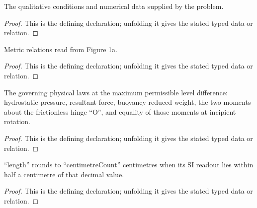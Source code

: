 \begin{definition}[MatchesProblemSetup]
  \label{decl:physics:IPhO_2026_1_A_1:MatchesProblemSetup}
  The qualitative conditions and numerical data supplied by the problem.
\end{definition}
\begin{proof}
  This is the defining declaration; unfolding it gives the stated typed data or relation.
\end{proof}

\begin{definition}[MatchesFigure1a]
  \label{decl:physics:IPhO_2026_1_A_1:MatchesFigure1a}
  Metric relations read from Figure 1a.
\end{definition}
\begin{proof}
  This is the defining declaration; unfolding it gives the stated typed data or relation.
\end{proof}

\begin{definition}[HydrostaticGateLaws]
  \label{decl:physics:IPhO_2026_1_A_1:HydrostaticGateLaws}
  The governing physical laws at the maximum permissible level difference: hydrostatic pressure, resultant force, buoyancy-reduced weight, the two moments about the frictionless hinge “O”, and equality of those moments at incipient rotation.
\end{definition}
\begin{proof}
  This is the defining declaration; unfolding it gives the stated typed data or relation.
\end{proof}

\begin{definition}[RoundsToNearestCentimeterSI]
  \label{decl:physics:IPhO_2026_1_A_1:RoundsToNearestCentimeterSI}
  “length” rounds to “centimetreCount” centimetres when its SI readout lies within half a centimetre of that decimal value.
\end{definition}
\begin{proof}
  This is the defining declaration; unfolding it gives the stated typed data or relation.
\end{proof}

